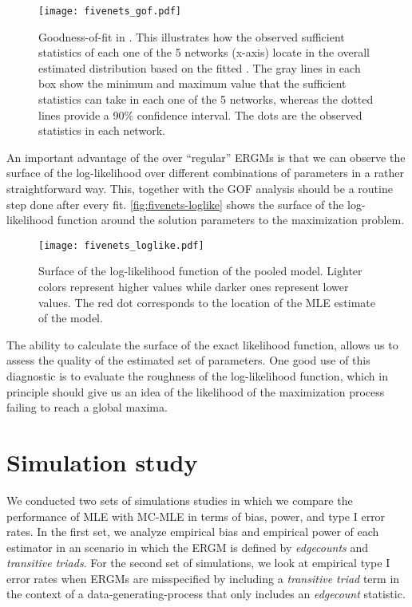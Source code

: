 \documentclass[12pt]{article}
\begin{document}
\begin{figure}[tb]
    \centering
    \caption{Goodness-of-fit in \ergmitos{}. This illustrates how the observed sufficient statistics of each one of the 5 networks (x-axis) locate in the overall estimated distribution based on the fitted \ergmito{}. The gray lines in each box show the minimum and maximum value that the sufficient statistics can take in each one of the 5 networks, whereas the dotted lines provide a 90\% confidence interval. The dots are the observed statistics in each network.}
    \texttt{[image: fivenets\_gof.pdf]}
    \label{fig:fivenets-gof}
\end{figure}

An important advantage of the \ergmitos{} over ``regular'' ERGMs is that we can observe the surface of the log-likelihood over different combinations of parameters in a rather straightforward way. This, together with the GOF analysis should be a routine step done after every \ergmito{} fit. \autoref{fig:fivenets-loglike} shows the surface of the log-likelihood function around the solution parameters to the maximization problem.

\begin{figure}[tb]
    \centering
    \caption{Surface of the log-likelihood function of the pooled \ergmito{} model. Lighter colors represent higher values while darker ones represent lower values. The red dot corresponds to the location of the MLE estimate of the model.}
    \texttt{[image: fivenets\_loglike.pdf]}
    \label{fig:fivenets-loglike}
\end{figure}

The ability to calculate the surface of the exact likelihood function, allows us to assess the quality of the estimated set of parameters. One good use of this diagnostic is to evaluate the roughness of the log-likelihood function, which in principle should give us an idea of the likelihood of the maximization process failing to reach a global maxima.

\pagebreak
\section{Simulation study}

We conducted two sets of simulations studies in which we compare the performance of MLE with MC-MLE in terms of bias, power, and type I error rates. In the first set, we analyze empirical bias and empirical power of each estimator in an scenario in which the ERGM is defined by \textit{edgecounts} and \textit{transitive triads}. For the second set of simulations, we look at empirical type I error rates when ERGMs are misspecified by including a \textit{transitive triad} term in the context of a data-generating-process that only includes an \textit{edgecount} statistic.
\end{document}
